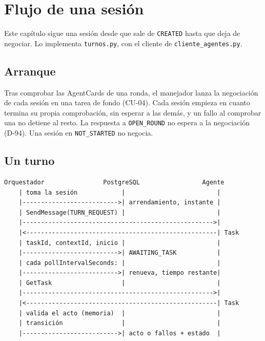 \chapter{Flujo de una sesión}

Este capítulo sigue una sesión desde que sale de \texttt{CREATED} hasta que deja de negociar. Lo implementa \texttt{turnos.py}, con el cliente de \texttt{cliente\_agentes.py}.

\section{Arranque}

Tras comprobar las AgentCards de una ronda, el manejador lanza la negociación de cada sesión en una tarea de fondo (CU-04). Cada sesión empieza en cuanto termina su propia comprobación, sin esperar a las demás, y un fallo al comprobar una no detiene al resto. La respuesta a \texttt{OPEN\_ROUND} no espera a la negociación (D-94). Una sesión en \texttt{NOT\_STARTED} no negocia.

\section{Un turno}

\begin{verbatim}
Orquestador                PostgreSQL                 Agente
    | toma la sesión            |                         |
    |-------------------------->| arrendamiento, instante |
    | SendMessage(TURN_REQUEST) |                         |
    |---------------------------------------------------->|
    |<----------------------------------------------------| Task
    | taskId, contextId, inicio |                         |
    |-------------------------->| AWAITING_TASK           |
    | cada pollIntervalSeconds: |                         |
    |-------------------------->| renueva, tiempo restante|
    | GetTask                   |                         |
    |---------------------------------------------------->|
    |<----------------------------------------------------| Task
    | valida el acto (memoria)  |                         |
    | transición                |                         |
    |-------------------------->| acto o fallos + estado  |
\end{verbatim}

